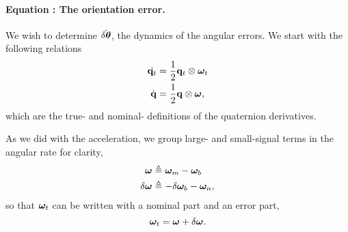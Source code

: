 \paragraph{Equation : The orientation error.}


We wish to determine $\dot{\delta{\bm \theta}}$, the dynamics of the angular errors. We start with the following relations
%
%
\begin{align}
\dot{{\bf q}_t} &= \frac{1}{2}{\bf q}_t\otimes{\bm \omega}_t \\
\dot{{\bf q}} &= \frac{1}{2}{\bf q}\otimes{\bm \omega} ,
\end{align}%
%
which are the true- and nominal- definitions of the quaternion derivatives.

As we did with the acceleration, we group large- and small-signal terms in the angular rate for clarity,
%
%
\begin{align}
{\bm \omega} &\triangleq {\bm \omega}_m - {\bm \omega}_b \label{equ:nomangrate}\\
\delta{\bm \omega} &\triangleq -\delta{\bm \omega}_b - {\bm \omega}_n, \label{equ:pertangrate}
\end{align}%
%
so that ${\bm \omega}_t$ can be written with a nominal part and an error part,
%
\begin{equation}
{\bm \omega}_t = {\bm \omega} + \delta{\bm \omega} .
\end{equation}%


